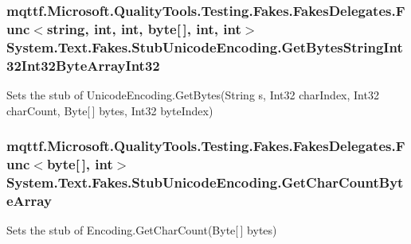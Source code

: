 \hypertarget{class_system_1_1_text_1_1_fakes_1_1_stub_unicode_encoding_acc5008a9d0b16ad33dcca95acded8d94}{
\subsubsection[{Get\-Bytes\-String\-Int32\-Int32\-Byte\-Array\-Int32}]{\setlength{\rightskip}{0pt plus 5cm}mqttf.\-Microsoft.\-Quality\-Tools.\-Testing.\-Fakes.\-Fakes\-Delegates.\-Func$<$string, int, int, byte\mbox{[}$\,$\mbox{]}, int, int$>$ System.\-Text.\-Fakes.\-Stub\-Unicode\-Encoding.\-Get\-Bytes\-String\-Int32\-Int32\-Byte\-Array\-Int32}}\label{class_system_1_1_text_1_1_fakes_1_1_stub_unicode_encoding_acc5008a9d0b16ad33dcca95acded8d94}


Sets the stub of Unicode\-Encoding.\-Get\-Bytes(\-String s, Int32 char\-Index, Int32 char\-Count, Byte\mbox{[}$\,$\mbox{]} bytes, Int32 byte\-Index)

\hypertarget{class_system_1_1_text_1_1_fakes_1_1_stub_unicode_encoding_acd478b6851a146648f749f633ef8a754}{
\subsubsection[{Get\-Char\-Count\-Byte\-Array}]{\setlength{\rightskip}{0pt plus 5cm}mqttf.\-Microsoft.\-Quality\-Tools.\-Testing.\-Fakes.\-Fakes\-Delegates.\-Func$<$byte\mbox{[}$\,$\mbox{]}, int$>$ System.\-Text.\-Fakes.\-Stub\-Unicode\-Encoding.\-Get\-Char\-Count\-Byte\-Array}}\label{class_system_1_1_text_1_1_fakes_1_1_stub_unicode_encoding_acd478b6851a146648f749f633ef8a754}


Sets the stub of Encoding.\-Get\-Char\-Count(\-Byte\mbox{[}$\,$\mbox{]} bytes)

